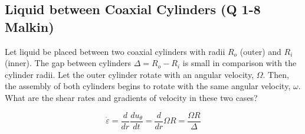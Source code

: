 \subsection{Liquid between Coaxial Cylinders (Q 1-8 Malkin)}
Let liquid be placed between two coaxial cylinders with radii $R_o$ (outer) and $R_i$ (inner).  The gap between cylinders $\Delta = R_o - R_i$ is small in comparison with the cylinder radii. Let  the outer cylinder rotate with an angular velocity, $\Omega$. Then, the assembly of both cylinders begins to rotate with the same angular velocity, $\omega$. What are the shear rates and gradients of velocity in these two cases?

\[
	\dot\varepsilon = \frac{d}{dr}\frac{du_\theta}{dt}
	= \frac{d}{dr}\Omega R
	= \frac{\Omega R}{\Delta}
\]


